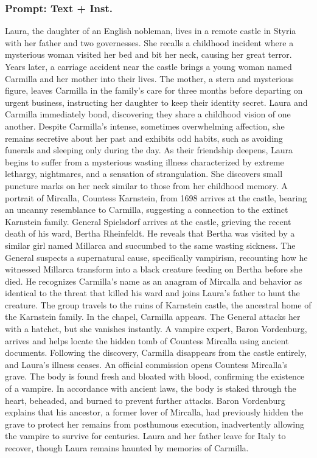 \documentclass{article} %
\begin{document}
\subsubsection{Prompt: Text + Inst.}

Laura, the daughter of an English nobleman, lives in a remote castle in Styria with her father and two governesses. She recalls a childhood incident where a mysterious woman visited her bed and bit her neck, causing her great terror. Years later, a carriage accident near the castle brings a young woman named Carmilla and her mother into their lives. The mother, a stern and mysterious figure, leaves Carmilla in the family's care for three months before departing on urgent business, instructing her daughter to keep their identity secret. Laura and Carmilla immediately bond, discovering they share a childhood vision of one another. Despite Carmilla's intense, sometimes overwhelming affection, she remains secretive about her past and exhibits odd habits, such as avoiding funerals and sleeping only during the day. As their friendship deepens, Laura begins to suffer from a mysterious wasting illness characterized by extreme lethargy, nightmares, and a sensation of strangulation. She discovers small puncture marks on her neck similar to those from her childhood memory. A portrait of Mircalla, Countess Karnstein, from 1698 arrives at the castle, bearing an uncanny resemblance to Carmilla, suggesting a connection to the extinct Karnstein family. General Spielsdorf arrives at the castle, grieving the recent death of his ward, Bertha Rheinfeldt. He reveals that Bertha was visited by a similar girl named Millarca and succumbed to the same wasting sickness. The General suspects a supernatural cause, specifically vampirism, recounting how he witnessed Millarca transform into a black creature feeding on Bertha before she died. He recognizes Carmilla's name as an anagram of Mircalla and behavior as identical to the threat that killed his ward and joins Laura's father to hunt the creature. The group travels to the ruins of Karnstein castle, the ancestral home of the Karnstein family. In the chapel, Carmilla appears. The General attacks her with a hatchet, but she vanishes instantly. A vampire expert, Baron Vordenburg, arrives and helps locate the hidden tomb of Countess Mircalla using ancient documents. Following the discovery, Carmilla disappears from the castle entirely, and Laura's illness ceases. An official commission opens Countess Mircalla's grave. The body is found fresh and bloated with blood, confirming the existence of a vampire. In accordance with ancient laws, the body is staked through the heart, beheaded, and burned to prevent further attacks. Baron Vordenburg explains that his ancestor, a former lover of Mircalla, had previously hidden the grave to protect her remains from posthumous execution, inadvertently allowing the vampire to survive for centuries. Laura and her father leave for Italy to recover, though Laura remains haunted by memories of Carmilla.
\end{document}
